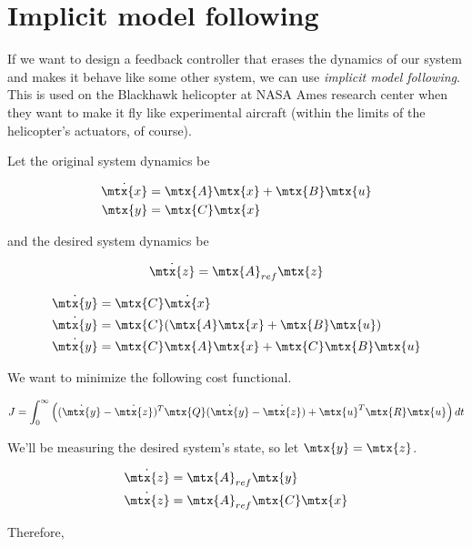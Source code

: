 \section{Implicit model following}
\label{sec:implicit_model_following}

If we want to design a feedback controller that erases the dynamics of our
system and makes it behave like some other system, we can use \textit{implicit
model following}. This is used on the Blackhawk helicopter at NASA Ames research
center when they want to make it fly like experimental aircraft (within the
limits of the helicopter's actuators, of course).

Let the original system dynamics be

\begin{align*}
  \dot{\mtx{x}} &= \mtx{A}\mtx{x} + \mtx{B}\mtx{u} \\
  \mtx{y} &= \mtx{C}\mtx{x}
\end{align*}

and the desired system dynamics be

\begin{equation*}
  \dot{\mtx{z}} = \mtx{A}_{ref}\mtx{z}
\end{equation*}

\begin{align*}
  \dot{\mtx{y}} &= \mtx{C}\dot{\mtx{x}} \\
  \dot{\mtx{y}} &= \mtx{C}(\mtx{A}\mtx{x} + \mtx{B}\mtx{u}) \\
  \dot{\mtx{y}} &= \mtx{C}\mtx{A}\mtx{x} + \mtx{C}\mtx{B}\mtx{u}
\end{align*}

We want to minimize the following cost functional.

\begin{equation*}
  J = \int_0^\infty \left((\dot{\mtx{y}} - \dot{\mtx{z}})^T \mtx{Q} (\dot{\mtx{y}} - \dot{\mtx{z}}) + \mtx{u}^T\mtx{R}\mtx{u}\right) dt
\end{equation*}

We'll be measuring the desired system's state, so let $\mtx{y} = \mtx{z}$.

\begin{align*}
  \dot{\mtx{z}} &= \mtx{A}_{ref}\mtx{y} \\
  \dot{\mtx{z}} &= \mtx{A}_{ref}\mtx{C}\mtx{x}
\end{align*}

Therefore,

